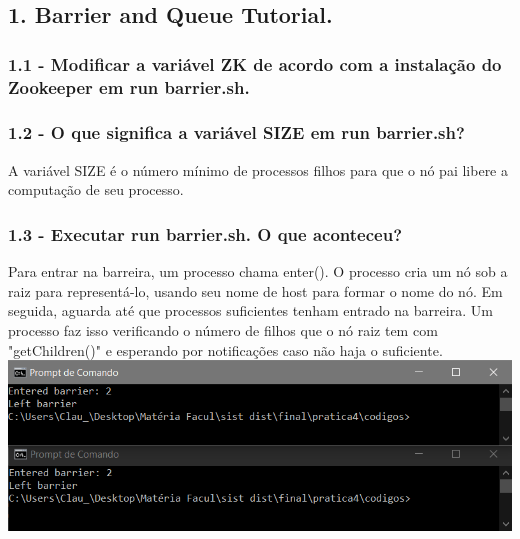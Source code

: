 \subsection*{1. Barrier and Queue Tutorial.}

\subsubsection{1.1 - Modificar a variável ZK de acordo com a instalação do Zookeeper em run barrier.sh.}

\vspace{-0.5em}
\begin{minipage}{\textwidth}
  \hspace{-1em}
  \centering
  
  \label{prog1}
  \hspace{1em}
\end{minipage}
\vspace{0.5em}

\subsubsection{1.2 - O que significa a variável SIZE em run barrier.sh?}
A variável SIZE é o número mínimo de processos filhos para que o nó pai libere a computação de seu processo.

\subsubsection{1.3 - Executar run barrier.sh. O que aconteceu?}
Para entrar na barreira, um processo chama enter(). O processo cria um nó sob a raiz para representá-lo, usando seu nome de host para formar o nome do nó. Em seguida, aguarda até que processos suficientes tenham entrado na barreira. Um processo faz isso verificando o número de filhos que o nó raiz tem com "getChildren()" e esperando por notificações caso não haja o suficiente.
\newline
\includegraphics{pratica4/prints/roteiro 1.3.PNG}

